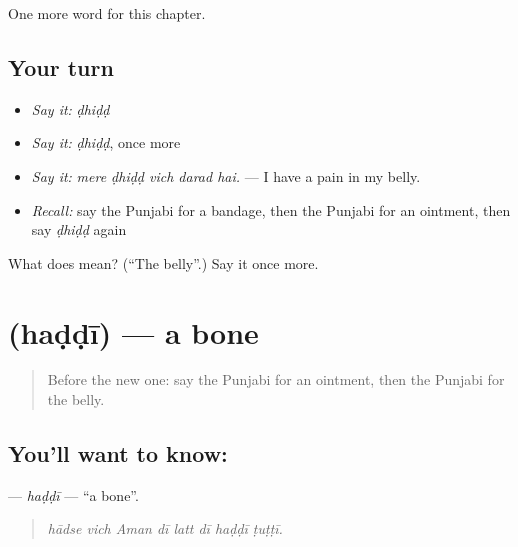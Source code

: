 \begin{grammarlens}[title={What you've built}]
One more word for this chapter.
\end{grammarlens}

\subsection*{Your turn}
\begin{itemize}
\raggedright
  \item \emph{Say it:} \emph{ḍhiḍḍ}
  \item \emph{Say it:} \emph{ḍhiḍḍ}, once more
  \item \emph{Say it:} \emph{mere ḍhiḍḍ vich darad hai.} — I have a pain in my belly.
  \item \emph{Recall:} say the Punjabi for a bandage, then the Punjabi for an ointment, then say \emph{ḍhiḍḍ} again
\end{itemize}

\begin{tcolorbox}[breakable,colback=teal!4,colframe=teal!35!black,title={Before you move on}]
What does  mean? (\textquotedblleft{}The belly\textquotedblright{}.) Say it once more.
\end{tcolorbox}
\section[\texorpdfstring{\pa{ਹੱਡੀ} (haḍḍī)}{ਹੱਡੀ (haḍḍī)}]{ (haḍḍī) — a bone}

\label{lesson:PA-C323-haddi}



\begin{quote}
Before the new one: say the Punjabi for an ointment, then the Punjabi for the belly.
\end{quote}

\subsection*{You'll want to know: }
\textbf{} — \emph{haḍḍī} — \textquotedblleft{}a bone\textquotedblright{}.

\begin{quote}
       
\end{quote}

\begin{quote}
\emph{hādse vich Aman dī latt dī haḍḍī ṭuṭṭī.}
\end{quote}

